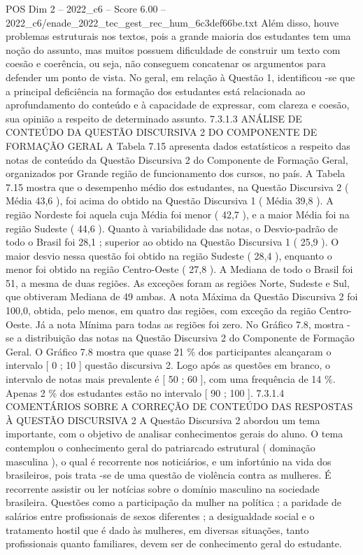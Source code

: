\begin{textsample}{POS Dim 2 – 2022\_c6 – Score 6.00 – 2022\_c6/enade\_2022\_tec\_gest\_rec\_hum\_6c3def66be.txt}
Além disso, houve problemas estruturais nos textos, pois a grande maioria dos estudantes tem uma noção do assunto, mas muitos possuem dificuldade de construir um texto com coesão e coerência, ou seja, não conseguem concatenar os argumentos para defender um ponto de vista.
No geral, em relação à Questão 1, identificou -se que a principal deficiência na formação dos estudantes está relacionada ao aprofundamento do conteúdo e à capacidade de expressar, com clareza e coesão, sua opinião a respeito de determinado assunto. 7.3.1.3 ANÁLISE DE CONTEÚDO DA QUESTÃO DISCURSIVA 2 DO COMPONENTE DE FORMAÇÃO GERAL A Tabela 7.15 apresenta dados estatísticos a respeito das notas de conteúdo da Questão Discursiva 2 do Componente de Formação Geral, organizados por Grande região de funcionamento dos cursos, no país.
A Tabela 7.15 mostra que o desempenho médio dos estudantes, na Questão Discursiva 2 ( Média 43,6 ), foi acima do obtido na Questão Discursiva 1 ( Média 39,8 ).
A região Nordeste foi aquela cuja Média foi menor ( 42,7 ), e a maior Média foi na região Sudeste ( 44,6 ).
Quanto à variabilidade das notas, o Desvio-padrão de todo o Brasil foi 28,1 ; superior ao obtido na Questão Discursiva 1 ( 25,9 ).
O maior desvio nessa questão foi obtido na região Sudeste ( 28,4 ), enquanto o menor foi obtido na região Centro-Oeste ( 27,8 ).
A Mediana de todo o Brasil foi 51, a mesma de duas regiões.
As exceções foram as regiões Norte, Sudeste e Sul, que obtiveram Mediana de 49 ambas.
A nota Máxima da Questão Discursiva 2 foi 100,0, obtida, pelo menos, em quatro das regiões, com exceção da região Centro-Oeste.
Já a nota Mínima para todas as regiões foi zero.
No Gráfico 7.8, mostra -se a distribuição das notas na Questão Discursiva 2 do Componente de Formação Geral.
O Gráfico 7.8 mostra que quase 21 \% dos participantes alcançaram o intervalo [ 0 ; 10 ] questão discursiva 2.
Logo após as questões em branco, o intervalo de notas mais prevalente é [ 50 ; 60 ], com uma frequência de 14 \%.
Apenas 2 \% dos estudantes estão no intervalo [ 90 ; 100 ]. 7.3.1.4 COMENTÁRIOS SOBRE A CORREÇÃO DE CONTEÚDO DAS RESPOSTAS À QUESTÃO DISCURSIVA 2 A Questão Discursiva 2 abordou um tema importante, com o objetivo de analisar conhecimentos gerais do aluno.
O tema contemplou o conhecimento geral do patriarcado estrutural ( dominação masculina ), o qual é recorrente nos noticiários, e um infortúnio na vida dos brasileiros, pois trata -se de uma questão de violência contra as mulheres.
É recorrente assistir ou ler notícias sobre o domínio masculino na sociedade brasileira.
Questões como a participação da mulher na política ; a paridade de salários entre profissionais de sexos diferentes ; a desigualdade social e o tratamento hostil que é dado às mulheres, em diversas situações, tanto profissionais quanto familiares, devem ser de conhecimento geral do estudante.

\end{textsample}
